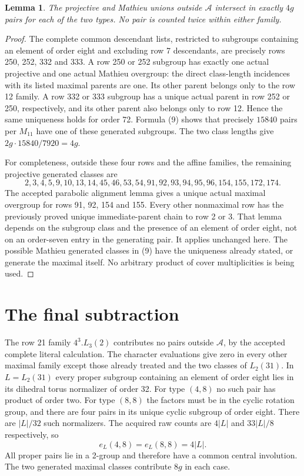 \documentclass[11pt,a4paper]{article}
\newtheorem{lemma}{Lemma}\newtheorem{theorem}{Theorem}
\begin{document}
\begin{lemma}\label{overlap}
The projective and Mathieu unions outside $\mathcal A$ intersect
in exactly $4g$ pairs for each of the two types. No pair is counted
twice within either family.
\end{lemma}
\begin{proof}
The complete common descendant lists, restricted to subgroups
containing an element of order eight and excluding row 7 descendants,
are precisely rows 250, 252, 332 and 333. A row 250 or 252 subgroup
has exactly one actual projective and one actual Mathieu overgroup:
the direct class-length incidences with its listed maximal parents
are one. Its other parent belongs only to the row 12 family.
A row 332 or 333 subgroup has a unique actual parent in row 252
or 250, respectively, and its other parent also belongs only to
row 12. Hence the same uniqueness holds for order 72. Formula (9)
shows that precisely $15840$ pairs per $M_{11}$ have one of these
generated subgroups. The two class lengths give
$2g\cdot15840/7920=4g$.

For completeness, outside these four rows and the affine families,
the remaining projective generated classes are
\[
 2,3,4,5,9,10,13,14,45,46,53,54,91,92,93,94,95,96,154,155,172,174.
\]
The accepted parabolic alignment lemma gives a unique actual
maximal overgroup for rows 91, 92, 154 and 155. Every other
nonmaximal row has the previously proved unique immediate-parent
chain to row 2 or 3. That lemma depends on the subgroup class and
the presence of an element of order eight, not on an order-seven
entry in the generating pair. It applies unchanged here.
The possible Mathieu generated classes in (9) have the uniqueness
already stated, or generate the maximal itself. No arbitrary
product of cover multiplicities is being used.
\end{proof}

\section*{The final subtraction}
The row 21 family $4^3.L_3(2)$ contributes no pairs outside
$\mathcal A$, by the accepted complete literal calculation.
The character evaluations give zero in every other maximal family
except those already treated and the two classes of $L_2(31)$.
In $L=L_2(31)$ every proper subgroup containing an element of order
eight lies in its dihedral torus normalizer of order 32. For type
$(4,8)$ no such pair has product of order two. For type $(8,8)$
the factors must be in the cyclic rotation group, and there are
four pairs in its unique cyclic subgroup of order eight. There
are $|L|/32$ such normalizers. The acquired raw counts are
$4|L|$ and $33|L|/8$ respectively, so
\[
                         e_L(4,8)=e_L(8,8)=4|L|.
\]
All proper pairs lie in a 2-group and therefore have a common
central involution. The two generated maximal classes contribute
$8g$ in each case.
\end{document}
